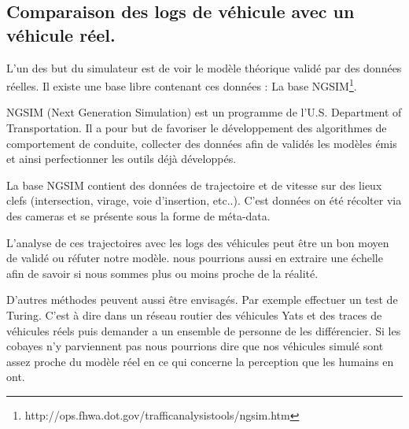 \documentclass[a4paper,11pt]{article}
\begin{document}




\subsection{Comparaison des logs de véhicule avec un véhicule réel.}

L'un des but du simulateur est de voir le modèle théorique validé par des données réelles. Il existe une base libre contenant ces données : La base NGSIM\footnote{http://ops.fhwa.dot.gov/trafficanalysistools/ngsim.htm}.

NGSIM (Next Generation Simulation) est un programme de l'U.S. Department of Transportation. Il a pour but de favoriser le développement des algorithmes de comportement de conduite, collecter des données afin de validés les modèles émis et ainsi perfectionner les outils déjà développés.

La base NGSIM contient des données de trajectoire et de vitesse sur des lieux clefs (intersection, virage, voie d'insertion, etc..). C'est données on été récolter via des cameras et se présente sous la forme de méta-data.

L'analyse de ces trajectoires avec les logs des véhicules peut être un bon moyen de validé ou réfuter notre modèle. nous pourrions aussi en extraire une échelle afin de savoir si nous sommes plus ou moins proche de la réalité. 

D'autres méthodes peuvent aussi être envisagés. Par exemple effectuer un test de Turing. C'est à dire dans un réseau routier des véhicules Yats et des traces de véhicules réels puis demander a un ensemble de personne de les différencier. Si les cobayes n'y parviennent pas nous pourrions dire que nos véhicules simulé sont assez proche du modèle réel en ce qui concerne la perception que les humains en ont.\\
\end{document}
